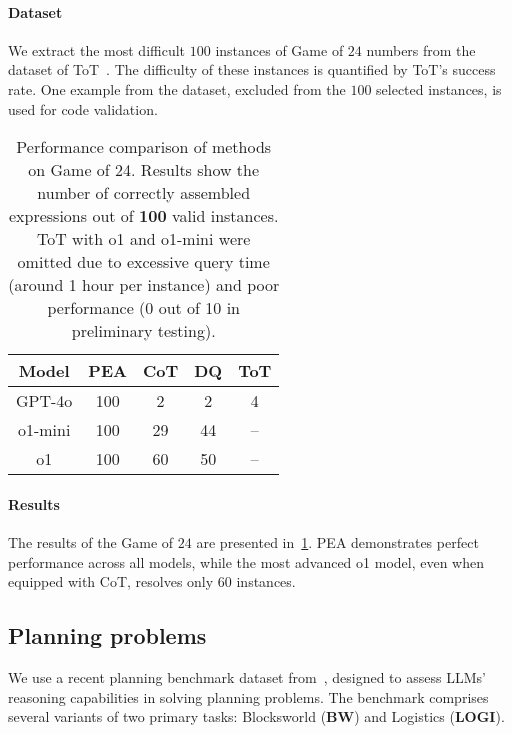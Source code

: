 \paragraph{Dataset}We extract the most difficult $100$ instances of Game of $24$ numbers from the dataset of ToT~\citep{yao2023tree}. The difficulty of these instances is quantified by ToT's success rate. One example from the dataset, excluded from the $100$ selected instances, is used for code validation.

\begin{table}
\begin{center}
\caption{Performance comparison of methods on Game of 24. Results show the number of correctly assembled expressions out of \textbf{100} valid instances. ToT with o1 and o1-mini were omitted due to excessive query time (around 1 hour per instance) and poor performance (0 out of 10 in preliminary testing).}
\begin{tabular}{ccccc} 
\toprule
\bf Model & \bf PEA & \bf CoT & \bf DQ & \bf ToT \\  
\hline
GPT-4o & 100  & 2 & 2 & 4\\  
\hline
o1-mini & 100  &  29  & 44  & -- \\  
\hline
o1 & 100 &  60 &  50  & -- \\ 
  \bottomrule
\end{tabular}
\label{tab:g24}
\end{center}
\vspace{-0.3cm}
\end{table}


\paragraph{Results}The results of the Game of $24$ are presented in~\cref{tab:g24}. PEA demonstrates perfect performance across all models, while the most advanced o1 model, even when equipped with CoT, resolves only $60$ instances. %

\subsection{Planning problems}\label{sec:planning}
We use a recent planning benchmark dataset from~\citet{valmeekam2023planbench}, designed to assess LLMs' reasoning capabilities in solving planning problems. The benchmark comprises several variants of two primary tasks: Blocksworld (\textbf{BW}) and Logistics (\textbf{LOGI}).

